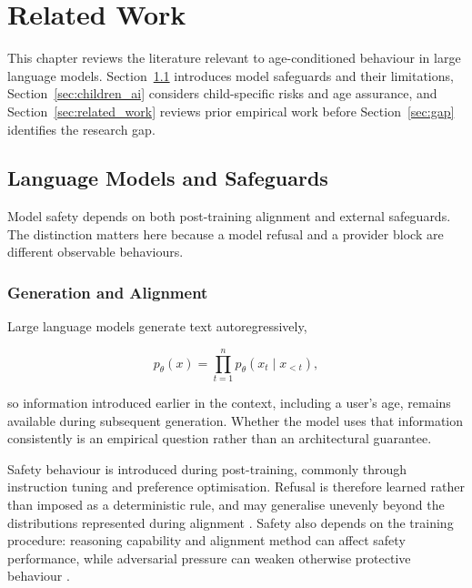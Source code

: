 \chapter{Related Work}
\label{ch:background}

This chapter reviews the literature relevant to age-conditioned behaviour in
large language models. Section~\ref{sec:primer} introduces model safeguards and
their limitations, Section~\ref{sec:children_ai} considers child-specific risks
and age assurance, and Section~\ref{sec:related_work} reviews prior empirical
work before Section~\ref{sec:gap} identifies the research gap.


\section{Language Models and Safeguards}
\label{sec:primer}

Model safety depends on both post-training alignment and external safeguards.
The distinction matters here because a model refusal and a provider block are
different observable behaviours.


\subsection{Generation and Alignment}
\label{sec:primer-foundations}

Large language models generate text autoregressively,

\begin{equation}
    p_{\theta}(x)
    =
    \prod_{t=1}^{n}
    p_{\theta}\!\left(x_t \mid x_{<t}\right),
    \label{eq:autoregressive}
\end{equation}

so information introduced earlier in the context, including a user's age,
remains available during subsequent generation. Whether the model uses that
information consistently is an empirical question rather than an architectural
guarantee.

Safety behaviour is introduced during post-training, commonly through
instruction tuning and preference optimisation. Refusal is therefore learned
rather than imposed as a deterministic rule, and may generalise unevenly beyond
the distributions represented during alignment
\cite{britoSafetyNotUniversal2026}. Safety also depends on the training procedure:
reasoning capability and alignment method can affect safety performance, while
adversarial pressure can weaken otherwise protective behaviour
\cite{liWhatMattersSafety2026,zhouHiddenRisksLarge2025}.


